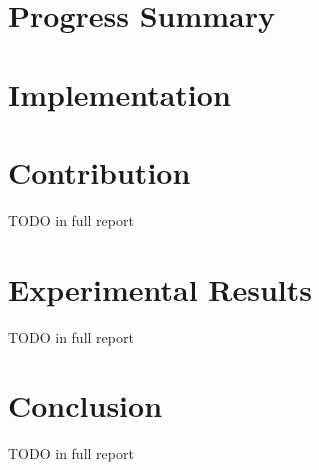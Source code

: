 \documentclass[12pt,twoside]{report}
\begin{document}
\chapter{Progress Summary}  %

%
%

\chapter{Implementation}

\chapter{Contribution} TODO in full report


\chapter{Experimental Results} TODO in full report


\chapter{Conclusion} TODO in full report


{}
%
\newpage
{} 


\end{document}
